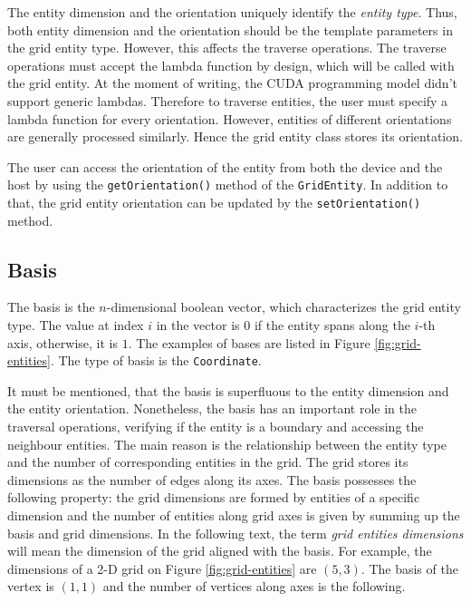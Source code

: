 The entity dimension and the orientation uniquely identify the \textit{entity type}.
Thus, both entity dimension and the orientation should be the template parameters in the grid entity type.
However, this affects the traverse operations.
The traverse operations must accept the lambda function by design, which will be called with the grid entity.
At the moment of writing, the CUDA programming model didn't support generic lambdas.
Therefore to traverse entities, the user must specify a lambda function for every orientation.
However, entities of different orientations are generally processed similarly.
Hence the grid entity class stores its orientation.

The user can access the orientation of the entity from both the device and the host by using the \texttt{getOrientation()} method of the \texttt{GridEntity}.
In addition to that, the grid entity orientation can be updated by the \texttt{setOrientation()} method.

\subsection{Basis} \label{sec:basis}

The basis is the \(n\)-dimensional boolean vector, which characterizes the grid entity type.
The value at index \(i\) in the vector is \(0\) if the entity spans along the \(i\)-th axis, otherwise, it is \(1\).
The examples of bases are listed in Figure \ref{fig:grid-entities}.
The type of basis is the \texttt{Coordinate}.

It must be mentioned, that the basis is superfluous to the entity dimension and the entity orientation.
Nonetheless, the basis has an important role in the traversal operations, verifying if the entity is a boundary and accessing the neighbour entities.
The main reason is the relationship between the entity type and the number of corresponding entities in the grid.
The grid stores its dimensions as the number of edges along its axes.
The basis possesses the following property: the grid dimensions are formed by entities of a specific dimension and the number of entities along grid axes is given by summing up the basis and grid dimensions.
In the following text, the term \textit{grid entities dimensions} will mean the dimension of the grid aligned with the basis.
For example, the dimensions of a 2-D grid on Figure \ref{fig:grid-entities} are \((5, 3)\).
The basis of the vertex is \((1, 1)\) and the number of vertices along axes is the following.

